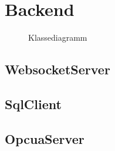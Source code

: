 \section{Backend}\label{sec:poc:backend}
\begin{figure}[ht]
  \centering
  \caption[Klassediagramm Backend]{Klassediagramm}
  \label{fig:backend:classDiag}
\end{figure}


\subsection{WebsocketServer}
\subsection{SqlClient}
\subsection{OpcuaServer}
